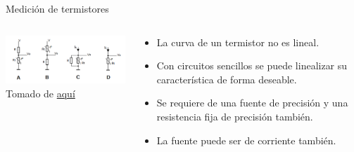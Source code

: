 \documentclass[aspectratio=169]{beamer}
\begin{document}
\begin{frame}{Medición de termistores}
    \begin{columns}[c, onlytextwidth]
            \begin{column}{0.5\textwidth}
           \includegraphics[width=7.5cm]{fig/450px-LinealizacionNTC.png}
            \\ \tiny{Tomado de \href{https://es.made-in-china.com/co_jpsensor/product_Ntc-10K-Thermistor-Collection_reeeohegg.html}{aquí}}
        \end{column}
        
        \begin{column}{0.45\textwidth}
            \begin{itemize}
                \item La curva de un termistor no es lineal. 
                \item Con circuitos sencillos se puede linealizar su característica de forma deseable.
                \item Se requiere de una fuente de precisión y una resistencia fija de precisión también.
                \item La fuente puede ser de corriente también.
            \end{itemize}
        \end{column}

    \end{columns}
\end{frame}
\end{document}
